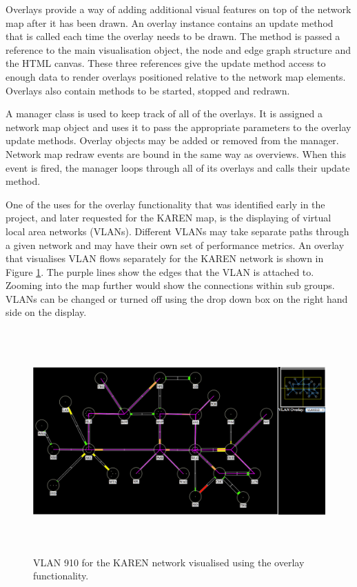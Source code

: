 \documentclass[11pt, a4paper]{report}
\begin{document}
Overlays provide a way of adding additional visual features on top of the
network map after it has been drawn. An overlay instance contains an update
method that is called each time the overlay needs to be drawn. The method is
passed a reference to the main visualisation object, the node and edge graph
structure and the HTML canvas. These three references give the update method
access to enough data to render overlays positioned relative to the network map
elements. Overlays also contain methods to be started, stopped and redrawn.

A manager class is used to keep track of all of the overlays. It is assigned a
network map object and uses it to pass the appropriate parameters to the overlay
update methods. Overlay objects may be added or removed from the manager.
Network map redraw events are bound in the same way as overviews. When this
event is fired, the manager loops through all of its overlays and calls their
update method. 

One of the uses for the overlay functionality that was identified early in the
project, and later requested for the KAREN map, is the displaying of virtual
local area networks (VLANs). Different VLANs may take separate paths through a
given network and may have their own set of performance metrics. An overlay that
visualises VLAN flows separately for the KAREN network is shown in Figure
\ref{fig:overlays1.0}. The purple lines show the edges that the VLAN is attached
to. Zooming into the map further would show the connections within sub groups.
VLANs can be changed or turned off using the drop down box on the right hand
side on the display.

\begin{figure} 
\centering
\includegraphics[width=170mm,height=85.71mm]{assets/overlays1-0.pdf}
\caption{VLAN 910 for the KAREN network visualised using the overlay
functionality.}
\label{fig:overlays1.0} 
\end{figure}
\end{document}
